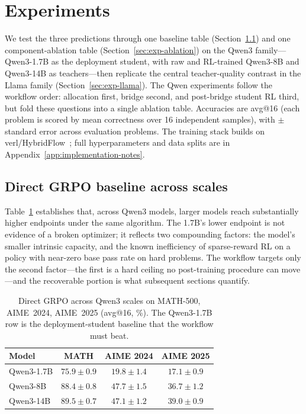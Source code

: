 \documentclass{article}
\begin{document}
\section{Experiments}
\label{sec:experiments}

We test the three predictions through one baseline table (Section~\ref{sec:exp-baseline}) and one component-ablation table (Section~\ref{sec:exp-ablation}) on the Qwen3 family---Qwen3-1.7B as the deployment student, with raw and RL-trained Qwen3-8B and Qwen3-14B as teachers---then replicate the central teacher-quality contrast in the Llama family (Section~\ref{sec:exp-llama}). The Qwen experiments follow the workflow order: allocation first, bridge second, and post-bridge student RL third, but fold these questions into a single ablation table. Accuracies are avg@16 (each problem is scored by mean correctness over 16 independent samples), with $\pm$ standard error across evaluation problems. The training stack builds on verl/HybridFlow~\citep{sheng2024hybridflow}; full hyperparameters and data splits are in Appendix~\ref{app:implementation-notes}.

\subsection{Direct GRPO baseline across scales}
\label{sec:exp-baseline}

Table~\ref{tab:grpo-scaling} establishes that, across Qwen3 models, larger models reach substantially higher endpoints under the same algorithm. The 1.7B's lower endpoint is not evidence of a broken optimizer; it reflects two compounding factors: the model's smaller intrinsic capacity, and the known inefficiency of sparse-reward RL on a policy with near-zero base pass rate on hard problems. The workflow targets only the second factor---the first is a hard ceiling no post-training procedure can move---and the recoverable portion is what subsequent sections quantify.

\begin{table}[t]
\caption{Direct GRPO across Qwen3 scales on MATH-500, AIME~2024, AIME~2025 (avg@16, \%). The Qwen3-1.7B row is the deployment-student baseline that the workflow must beat.}
\label{tab:grpo-scaling}
\centering
\small
\begin{tabular}{lccc}
\toprule
Model & MATH & AIME 2024 & AIME 2025 \\
\midrule
Qwen3-1.7B & $75.9 \pm 0.9$ & $19.8 \pm 1.4$ & $17.1 \pm 0.9$ \\
Qwen3-8B   & $88.4 \pm 0.8$ & $47.7 \pm 1.5$ & $36.7 \pm 1.2$ \\
Qwen3-14B  & $89.5 \pm 0.7$ & $47.1 \pm 1.2$ & $39.0 \pm 0.9$ \\
\bottomrule
\end{tabular}
\end{table}
\end{document}
